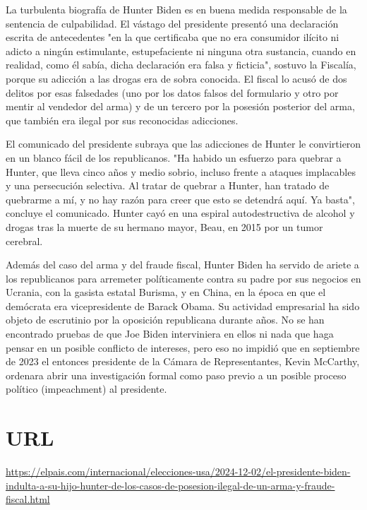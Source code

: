 \documentclass[10pt,a4paper]{article}
\begin{document}
\par\medskip
La turbulenta biograf\'{i}a de Hunter Biden es en buena medida responsable de la sentencia de culpabilidad. El v\'{a}stago del presidente present\'{o} una declaraci\'{o}n escrita de antecedentes "en la que certificaba que no era consumidor il\'{i}cito ni adicto a ning\'{u}n estimulante, estupefaciente ni ninguna otra sustancia, cuando en realidad, como \'{e}l sab\'{i}a, dicha declaraci\'{o}n era falsa y ficticia", sostuvo la Fiscal\'{i}a, porque su adicci\'{o}n a las drogas era de sobra conocida. El fiscal lo acus\'{o} de dos delitos por esas falsedades (uno por los datos falsos del formulario y otro por mentir al vendedor del arma) y de un tercero por la posesi\'{o}n posterior del arma, que tambi\'{e}n era ilegal por sus reconocidas adicciones.
\par\medskip
El comunicado del presidente subraya que las adicciones de Hunter le convirtieron en un blanco f\'{a}cil de los republicanos. "Ha habido un esfuerzo para quebrar a Hunter, que lleva cinco a\~{n}os y medio sobrio, incluso frente a ataques implacables y una persecuci\'{o}n selectiva. Al tratar de quebrar a Hunter, han tratado de quebrarme a m\'{i}, y no hay raz\'{o}n para creer que esto se detendr\'{a} aqu\'{i}. Ya basta", concluye el comunicado. Hunter cay\'{o} en una espiral autodestructiva de alcohol y drogas tras la muerte de su hermano mayor, Beau, en 2015 por un tumor cerebral.
\par\medskip
Adem\'{a}s del caso del arma y del fraude fiscal, Hunter Biden ha servido de ariete a los republicanos para arremeter pol\'{i}ticamente contra su padre por sus negocios en Ucrania, con la gasista estatal Burisma, y en China, en la \'{e}poca en que el dem\'{o}crata era vicepresidente de Barack Obama. Su actividad empresarial ha sido objeto de escrutinio por la oposici\'{o}n republicana durante a\~{n}os. No se han encontrado pruebas de que Joe Biden interviniera en ellos ni nada que haga pensar en un posible conflicto de intereses, pero eso no impidi\'{o} que en septiembre de 2023 el entonces presidente de la C\'{a}mara de Representantes, Kevin McCarthy, ordenara abrir una investigaci\'{o}n formal como paso previo a un posible proceso pol\'{i}tico (impeachment) al presidente.
\vspace{1em}

\section*{URL}
\url{ https://elpais.com/internacional/elecciones-usa/2024-12-02/el-presidente-biden-indulta-a-su-hijo-hunter-de-los-casos-de-posesion-ilegal-de-un-arma-y-fraude-fiscal.html }
\vspace{1em}
\end{document}
